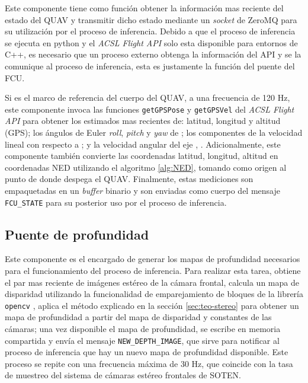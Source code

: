 Este componente tiene como función obtener la información mas reciente del estado del QUAV y transmitir dicho estado mediante un \textit{socket} de ZeroMQ para su utilización por el proceso de inferencia. Debido a que el proceso de inferencia se ejecuta en python y el \textit{ACSL Flight API} solo esta disponible para entornos de C++, es necesario que un proceso externo obtenga la información del API y se la comunique al proceso de inferencia, esta es justamente la función del puente del FCU.

Si  es el marco de referencia del cuerpo del QUAV, a una frecuencia de 120 Hz, este componente invoca las funciones \texttt{getGPSPose} y \texttt{getGPSVel} del \textit{ACSL Flight API} para obtener los estimados mas recientes de: latitud, longitud y altitud (GPS); los ángulos de Euler \textit{roll}, \textit{pitch} y \textit{yaw} de ; los componentes  de la velocidad lineal con respecto a ; y la velocidad angular del eje , . Adicionalmente, este componente también convierte las coordenadas latitud, longitud, altitud en coordenadas NED utilizando el algoritmo \ref{alg:NED}, tomando como origen al punto de donde despega el QUAV. Finalmente, estas mediciones son empaquetadas en un \textit{buffer} binario y son enviadas como cuerpo del mensaje \texttt{FCU\_STATE} para su posterior uso por el proceso de inferencia.


\subsection{Puente de profundidad}

Este componente es el encargado de generar los mapas de profundidad necesarios para el funcionamiento del proceso de inferencia. Para realizar esta tarea, obtiene el par mas reciente de imágenes estéreo de la cámara frontal, calcula un mapa de disparidad utilizando la funcionalidad de emparejamiento de bloques de la librería \texttt{opencv} \cite{bradski2000opencv}, aplica el método explicado en la sección \ref{sec:teo-stereo} para obtener un mapa de profundidad a partir del mapa de disparidad y constantes de las cámaras; una vez disponible el mapa de profundidad, se escribe en memoria compartida y envía el mensaje \texttt{NEW\_DEPTH\_IMAGE}, que sirve para notificar al proceso de inferencia que hay un nuevo mapa de profundidad disponible. Este proceso se repite con una frecuencia máxima de 30 Hz, que coincide con la tasa de muestreo del sistema de cámaras estéreo frontales de SOTEN.

